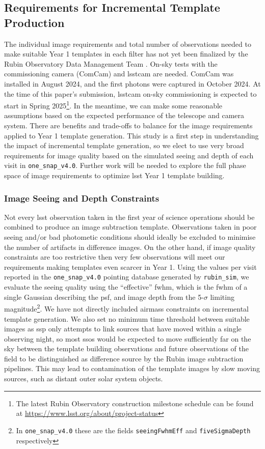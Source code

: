 \documentclass[preprintm,linenumbers]{aastex631}
\newcommand{\baseline}{\texttt{one\_snap\_v4.0}\xspace}
\newcommand{\rubinsim}{\texttt{rubin\_sim}\xspace}
\begin{document}
	\subsection{Requirements for Incremental Template Production}
	The individual image requirements and total number of observations needed to make suitable Year 1 templates in each filter has not yet been finalized by the Rubin Observatory Data Management Team \citep{DMTN-107,RTN-011}. 
 On-sky tests with the commissioning camera (ComCam) and \gls*{lsstcam} are needed. 
 ComCam was installed in August 2024, and the first photons were captured in October 2024. 
 At the time of this paper's submission, \gls*{lsstcam} on-sky commissioning is expected to start in Spring 2025\footnote{The latest Rubin Observatory construction milestone schedule can be found at \url{https://www.lsst.org/about/project-status}}. 
 In the meantime, we can make some reasonable assumptions based on the expected performance of the telescope and camera system. 
 There are benefits and trade-offs to balance for the image requirements applied to Year 1 template generation. This study is a first step in understanding the impact of incremental template generation,  so we elect to use very broad requirements for image quality based on the simulated seeing and depth of each visit in \baseline. 
 Further work will be needed to explore the full phase space of image requirements to optimize \gls*{lsst} Year 1 template building. 
	
	\subsubsection{Image Seeing and Depth Constraints}
	\label{sec:imageqa}
	Not every \gls*{lsst} observation taken in the first year of science operations should be combined to produce an image subtraction template. 
 Observations taken in  poor seeing and/or bad photometic conditions should ideally be excluded to minimise the number of artifacts in difference images. 
	On the other hand, if image quality constraints are too restrictive then very few observations will meet our requirements making templates even scarcer in Year 1.  
	Using the values per visit reported in the \baseline pointing database generated by \rubinsim, we evaluate the seeing quality using the ``effective” \gls*{fwhm}, which is the \gls*{fwhm} of a single Gaussian describing the \gls*{psf}, and image depth from the 5-$\sigma$ limiting magnitude\footnote{In \baseline these are the fields \texttt{seeingFwhmEff} and \texttt{fiveSigmaDepth} respectively}. 
	We have not directly included airmass constraints on incremental template generation. 
 We also set no minimum time threshold between suitable images as \gls*{ssp} only attempts to link sources that have moved within a single observing night, so most \glspl*{sso} would be expected to move sufficiently far on the sky between the template building observations and future observations of the field to be distinguished as difference source by the Rubin image subtraction pipelines.
 This may lead to contamination of the template images by slow moving sources, such as distant outer solar system objects.
	
\end{document}
